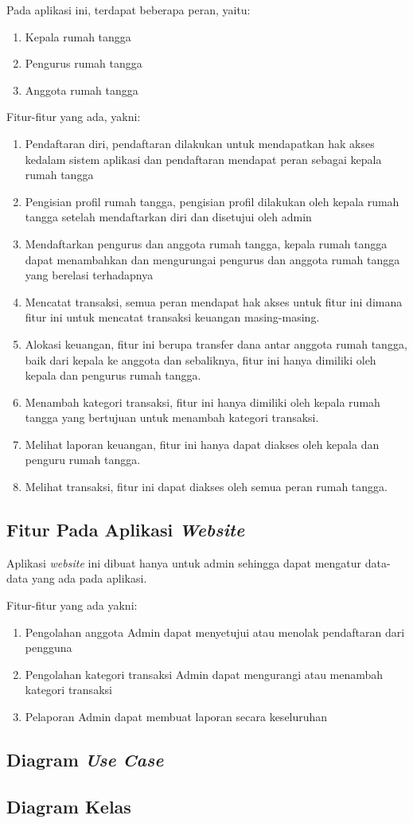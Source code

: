 \hspace{0,5cm}Pada aplikasi ini, terdapat beberapa peran, yaitu:
\begin{enumerate}
	\item Kepala rumah tangga
	\item	Pengurus rumah tangga
	\item Anggota rumah tangga
\end{enumerate}

Fitur-fitur yang ada, yakni:
\begin{enumerate}
	\item Pendaftaran diri, pendaftaran dilakukan untuk mendapatkan hak akses kedalam sistem aplikasi dan pendaftaran mendapat peran sebagai kepala rumah tangga
	\item Pengisian profil rumah tangga, pengisian profil dilakukan oleh kepala rumah tangga setelah mendaftarkan diri dan disetujui oleh admin
	\item	Mendaftarkan pengurus dan anggota rumah tangga, kepala rumah tangga dapat menambahkan dan mengurungai pengurus dan anggota rumah tangga yang berelasi terhadapnya
	\item Mencatat transaksi, semua peran mendapat hak akses untuk fitur ini dimana fitur ini untuk mencatat transaksi keuangan masing-masing.
	\item Alokasi keuangan, fitur ini berupa transfer dana antar anggota rumah tangga, baik dari kepala ke anggota dan sebaliknya, fitur ini hanya dimiliki oleh kepala dan pengurus rumah tangga.
	\item Menambah kategori transaksi, fitur ini hanya dimiliki oleh kepala rumah tangga yang bertujuan untuk menambah kategori transaksi.
	\item Melihat laporan keuangan, fitur ini hanya dapat diakses oleh kepala dan penguru rumah tangga.
	\item Melihat transaksi, fitur ini dapat diakses oleh semua peran rumah tangga.
\end{enumerate}

\subsection{Fitur Pada Aplikasi \textit{Website}}

\hspace{0,5cm}Aplikasi \textit{website} ini dibuat hanya untuk admin sehingga dapat mengatur data-data yang ada pada aplikasi.

Fitur-fitur yang ada yakni:
\begin{enumerate}
	\item Pengolahan anggota
				Admin dapat menyetujui atau menolak pendaftaran dari pengguna
	\item	Pengolahan kategori transaksi
				Admin dapat mengurangi atau menambah kategori transaksi
	\item Pelaporan
				Admin dapat membuat laporan secara keseluruhan
\end{enumerate}

\subsection{Diagram \textit{Use Case}}
\subsection{Diagram Kelas}